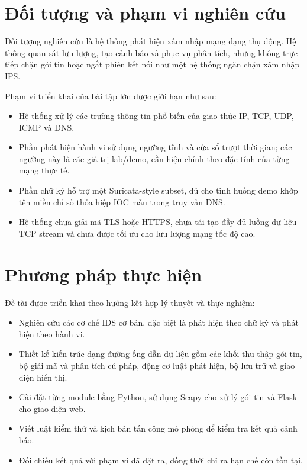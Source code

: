 \section{Đối tượng và phạm vi nghiên cứu}
Đối tượng nghiên cứu là hệ thống phát hiện xâm nhập mạng dạng thụ động. Hệ thống quan sát lưu lượng, tạo cảnh báo và phục vụ phân tích, nhưng không trực tiếp chặn gói tin hoặc ngắt phiên kết nối như một hệ thống ngăn chặn xâm nhập IPS.

Phạm vi triển khai của bài tập lớn được giới hạn như sau:
\begin{itemize}
    \item Hệ thống xử lý các trường thông tin phổ biến của giao thức IP, TCP, UDP, ICMP và DNS.
    \item Phần phát hiện hành vi sử dụng ngưỡng tĩnh và cửa sổ trượt thời gian; các ngưỡng này là các giá trị lab/demo, cần hiệu chỉnh theo đặc tính của từng mạng thực tế.
    \item Phần chữ ký hỗ trợ một Suricata-style subset, đủ cho tình huống demo khớp tên miền chỉ số thỏa hiệp IOC mẫu trong truy vấn DNS.
    \item Hệ thống chưa giải mã TLS hoặc HTTPS, chưa tái tạo đầy đủ luồng dữ liệu TCP stream và chưa được tối ưu cho lưu lượng mạng tốc độ cao.
\end{itemize}

\section{Phương pháp thực hiện}
Đề tài được triển khai theo hướng kết hợp lý thuyết và thực nghiệm:
\begin{itemize}
    \item Nghiên cứu các cơ chế IDS cơ bản, đặc biệt là phát hiện theo chữ ký và phát hiện theo hành vi.
    \item Thiết kế kiến trúc dạng đường ống dẫn dữ liệu gồm các khối thu thập gói tin, bộ giải mã và phân tích cú pháp, động cơ luật phát hiện, bộ lưu trữ và giao diện hiển thị.
    \item Cài đặt từng module bằng Python, sử dụng Scapy cho xử lý gói tin và Flask cho giao diện web.
    \item Viết luật kiểm thử và kịch bản tấn công mô phỏng để kiểm tra kết quả cảnh báo.
    \item Đối chiếu kết quả với phạm vi đã đặt ra, đồng thời chỉ ra hạn chế còn tồn tại.
\end{itemize}

